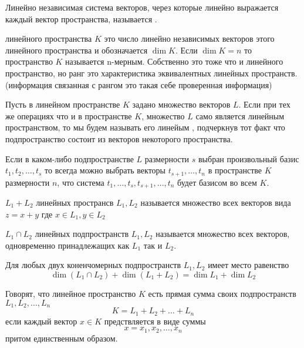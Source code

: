 \begin{defin}[базиса]
  Линейно независимая система векторов, через которые линейно выражается каждый
вектор пространства, называется .
\end{defin}

   линейного пространства $K$ это число линейно независимых
векторов этого линейного пространства и обозначается $\dim K$. Если $\dim K = n$
то пространство $K$ называется n-мерным. Собственно это тоже что и 
линейного пространство, но ранг это характеристика эквивалентных линейных
пространств.(информация связанная с рангом это такая себе проверенная
информация)

\begin{defin}[подпространства]
  Пусть в линейном пространстве $K$ задано множество векторов $L$. Если при тех
же операциях что и в пространстве $K$, множество $L$ само является линейным
пространством, то мы будем называть его линейым ,
подчеркнув тот факт что подпространство состоит из векторов некоторого
пространства.
\end{defin}

\begin{theorem}
  Если в каком-либо подпространстве $L$ размерности $s$ выбран произвольный
базис $t_1, t_2, \ldots, t_s$ то всегда можно выбрать векторы
$t_{s+1}, \ldots, t_n$ в пространстве $K$ размерности $n$, что система
$t_1, \ldots, t_s, t_{s+1}, \ldots, t_n$ будет базисом во всем $K$.
\end{theorem}

   $L_1 + L_2$ линейных пространсв $L_1, L_2$ называется множество
всех векторов вида $z = x + y$ где $x \in L_1, y \in L_2$

   $L_1 \cap L_2$ линейных подпространств $L_1, L_2$ называется
множество всех векторов, одновременно принадлежащих как $L_1$ так и $L_2$.\\

\begin{theorem}
  Для любых двух коненчомерных подпространств $L_1, L_2$ имеет место равенство
  $$
  \dim(L_1 \cap L_2) + \dim(L_1 + L_2) = \dim L_1 + \dim L_2
  $$
\end{theorem}

\begin{defin}
  Говорят, что линейное пространство $K$ есть прямая сумма своих подпространств
$L_1, L_2, \ldots, L_n$
  $$
  K = L_1 + L_2 + \ldots + L_n
  $$
  если каждый вектор $x \in K$ предствляется в виде суммы
  $$
  x = x_1, x_2, \ldots, x_n
  $$
  притом единственным образом.
\end{defin}


